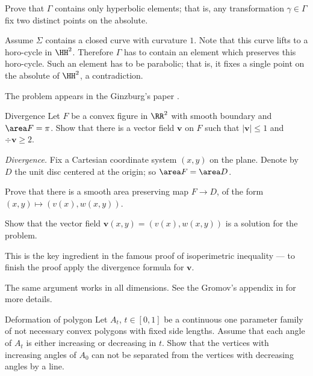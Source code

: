 Prove that $\Gamma$ contains only hyperbolic elements; that is, any transformation $\gamma\in\Gamma$ fix two distinct points on the absolute.

Assume $\Sigma$ contains a closed curve with curvature $1$.
Note that this curve lifts to a horo-cycle in $\HH^2$.
Therefore $\Gamma$ has to contain an element which preserves this horo-cycle.
Such an element has to be parabolic;
that is, it fixes a single point on the absolute of $\HH^2$,
 a contradiction.

The problem appears in the Ginzburg's paper \cite{ginzburg}.












\begin{pr}{}{Divergence}\label{Divergence} %
Let $F$ be a convex figure in $\RR^2$ with smooth boundary
and $\area F=\pi$.
Show that there is a vector field $\bm{v}$ on $F$
such that $|\bm{v}|\le 1$ and $\div \bm{v}\ge 2$. 
\end{pr}

\textit{Divergence.}
Fix a Cartesian coordinate system $(x,y)$ on the plane.
Denote by $D$ the unit disc centered at the origin;
so $\area F=\area D$.
 
Prove that there is a smooth area preserving map $F\to D$, 
of the form
$(x,y)\mapsto (v(x),w(x,y))$.

Show that the vector field $\bm{v}(x,y)=(v(x),w(x,y))$
is a solution for the problem.

This is the key ingredient in the famous proof of isoperimetric inequality --- to finish the proof apply the divergence formula for $\bm{v}$.

The same argument works in all dimensions.
See the Gromov's appendix in \cite{gromov-apendix} for more details.












\begin{pr}{}{Deformation of polygon}\label{Deformation of polygon}
Let $A_t$, $t\in [0,1]$ be a continuous one parameter family of not necessary convex polygons with fixed side lengths.
Assume that each angle of $A_t$ is either increasing or decreasing in $t$.
Show that the vertices with increasing angles of $A_0$
can not be separated from the vertices with decreasing angles by a line.
\end{pr}


